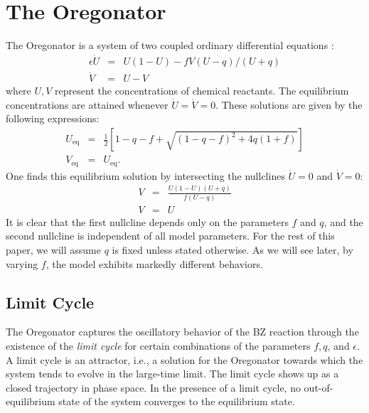\documentclass[twocolumn,amsmath,amssymb,aps]{revtex4}
\begin{document}
\section{The Oregonator}
The Oregonator is a system of two coupled ordinary differential equations \cite{doi:10.1063/1.1681288}:
\begin{eqnarray*}
\epsilon \dot{U} &=& U(1-U) - fV(U-q)/(U+q) \\
\dot{V} &=&  U-V
\end{eqnarray*}
where $U,V$ represent the concentrations of chemical reactants. The equilibrium concentrations are attained whenever $\dot{U} = \dot{V} = 0$. These solutions are given by the following expressions:
\begin{eqnarray*}
U_{\text{eq}} &=& \frac{1}{2}\left[1-q-f + \sqrt{(1-q-f)^2 + 4q(1+f)}\right]\nonumber \\ 
V_{\text{eq}} &=& U_{\text{eq}}. 
\end{eqnarray*}
One finds this equilibrium solution by intersecting the nullclines $\dot{U} = 0$ and $\dot{V} = 0$:
\begin{eqnarray*} 
V &=& \frac{U(1-U)(U+q)}{f(U-q)}\\
V &=&U 
\end{eqnarray*}
It is clear that the first nullcline depends only on the parameters $f$ and $q$, and the second nullcline is independent of all model parameters. For the rest of this paper, we will assume $q$ is fixed unless stated otherwise. As we will see later, by varying $f$, the model exhibits markedly different behaviors. 

\subsection{Limit Cycle}
The Oregonator captures the oscillatory behavior of the BZ reaction through the existence of the \textit{limit cycle} for certain combinations of the parameters $f,q$, and $\epsilon$. A limit cycle is an attractor, i.e., a solution for the Oregonator towards which the system tends to evolve in the large-time limit. The limit cycle shows up as a closed trajectory in phase space. In the presence of a limit cycle, no out-of-equilibrium state of the system converges to the equilibrium state.
\end{document}
